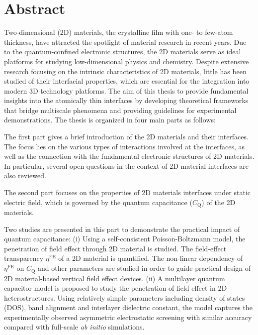 \begingroup
\let\clearpage\relax
\let\cleardoublepage\relax
\let\cleardoublepage\relax

\chapter*{Abstract}

Two-dimensional (2D) materials, the crystalline film with one- to
few-atom thickness, have attracted the spotlight of material research
in recent years.
% 
Due to the quantum-confined electronic structures, the 2D materials
serve as ideal platforms for studying low-dimensional physics and
chemistry.
% 
Despite extensive research focusing on the intrinsic characteristics
of 2D materials, little has been studied of their interfacial
properties, which are essential for the integration into modern 3D
technology platforms.
%
The aim of this thesis to provide fundamental insights into the
atomically thin interfaces by developing theoretical frameworks that
bridge multiscale phenomena and providing guidelines for experimental
demonstrations.  The thesis is organized
in four main parts as follows:

The first part gives a brief introduction of the 2D materials and
their interfaces.
%
The focus lies on the various types of interactions
involved at the interfaces, as well as the connection with the
fundamental electronic structures of 2D materials.
%
In particular, several open questions in the context of
2D material interfaces are also reviewed.

The second part focuses on the properties of 2D materials interfaces
under static electric field, which is governed by the quantum
capacitance ($C_{\mathrm{Q}}$) of the 2D materials.
%


Two studies are presented in this part to demonstrate the practical
impact of quantum capacitance:
%
(i) Using a self-consistent Poisson-Boltzmann model, the penetration of field effect through 2D material is studied. The field-effect transparency
$\eta^{\mathrm{FE}}$ of a 2D material is quantified. The
non-linear dependency of $\eta^{\mathrm{FE}}$ on $C_{\mathrm{Q}}$ and other
parameters are studied in order to guide practical design of 2D
material-based vertical field effect devices.
%
(ii) A multilayer quantum capacitor model is proposed to study the
penetration of field effect in 2D heterostructures. Using relatively
simple parameters including density of states (DOS), band alignment
and interlayer dielectric constant, the model captures the
experimentally observed asymmetric electrostatic screening with
similar accuracy compared with full-scale \textit{ab initio}
simulations.

